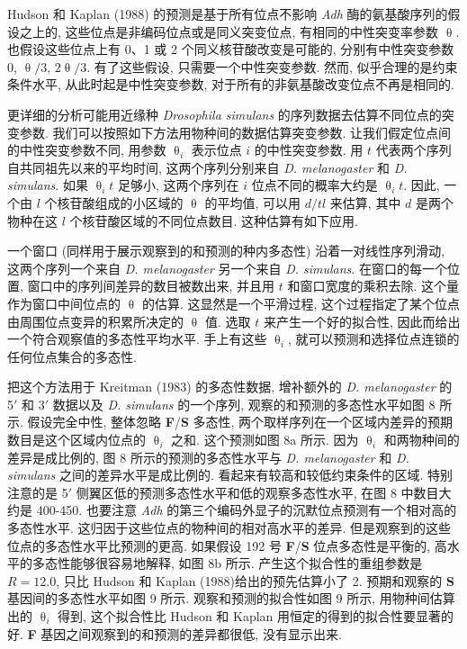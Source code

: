 \documentclass[
    12pt,%
    ]{article}
\begin{document}
Hudson 和 Kaplan (1988) 的预测是基于所有位点不影响 \textit{Adh} 酶的氨基酸序列的假设之上的,
这些位点是非编码位点或是同义突变位点, 有相同的中性突变率参数 $\uptheta$. 也假设这些位点上有 0、1 或 2
个同义核苷酸改变是可能的, 分别有中性突变参数 0, $\uptheta /3$, $2 \uptheta /3$. 有了这些假设, 只需要一个中性突变参数. 然而,
似乎合理的是约束条件水平, 从此时起是中性突变参数, 对于所有的非氨基酸改变位点不再是相同的.

更详细的分析可能用近缘种 \textit{Drosophila simulans} 的序列数据去估算不同位点的突变参数.
我们可以按照如下方法用物种间的数据估算突变参数. 让我们假定位点间的中性突变参数不同, 用参数 $\uptheta_{i}$ 表示位点 $i$
的中性突变参数. 用 $t$ 代表两个序列自共同祖先以来的平均时间, 这两个序列分别来自 \textit{D. melanogaster} 和
\textit{D. simulans}. 如果 $\uptheta_{i}t$ 足够小, 这两个序列在 $i$ 位点不同的概率大约是 $\uptheta_{i}t$. 因此,
一个由 $l$ 个核苷酸组成的小区域的 $\uptheta$ 的平均值, 可以用 $d/tl$ 来估算, 其中 $d$ 是两个物种在这 $l$
个核苷酸区域的不同位点数目. 这种估算有如下应用.

一个窗口 (同样用于展示观察到的和预测的种内多态性) 沿着一对线性序列滑动, 这两个序列一个来自 \textit{D.
    melanogaster} 另一个来自 \textit{D. simulans}. 在窗口的每一个位置, 窗口中的序列间差异的数目被数出来, 并且用 $t$
和窗口宽度的乘积去除. 这个量作为窗口中间位点的 $\uptheta$ 的估算. 这显然是一个平滑过程,
这个过程指定了某个位点由周围位点变异的积累所决定的 $\uptheta$ 值. 选取 $t$ 来产生一个好的拟合性,
因此而给出一个符合观察值的多态性平均水平. 手上有这些 $\uptheta_{i}$, 就可以预测和选择位点连锁的任何位点集合的多态性.

把这个方法用于 Kreitman (1983) 的多态性数据, 增补额外的 \textit{D. melanogaster} 的 5${\prime}$ 和
3${\prime}$ 数据以及 \textit{D. simulans} 的一个序列, 观察的和预测的多态性水平如图 8 所示. 假设完全中性,
整体忽略 \textbf{F}/\textbf{S} 多态性, 两个取样序列在一个区域内差异的预期数目是这个区域内位点的 $\uptheta _{i}$ 之和.
这个预测如图 8a 所示. 因为 $\uptheta _{i}$ 和两物种间的差异是成比例的, 图 8 所示的预测的多态性水平与 \textit{D.
    melanogaster} 和 \textit{D. simulans} 之间的差异水平是成比例的. 看起来有较高和较低约束条件的区域. 特别注意的是
5${\prime}$ 侧翼区低的预测多态性水平和低的观察多态性水平, 在图 8 中数目大约是 400-450.
也要注意 \textit{Adh} 的第三个编码外显子的沉默位点预测有一个相对高的多态性水平. 这归因于这些位点的物种间的相对高水平的差异.
但是观察到的这些位点的多态性水平比预测的更高. 如果假设 192 号 \textbf{F}/\textbf{S} 位点多态性是平衡的,
高水平的多态性能够很容易地解释, 如图 8b 所示. 产生这个拟合性的重组参数是 $R=12.0$, 只比 Hudson 和
Kaplan (1988)给出的预先估算小了 2. 预期和观察的 \textbf{S} 基因间的多态性水平如图 9 所示. 观察和预测的拟合性如图 9
所示, 用物种间估算出的 $\uptheta _{i}$ 得到, 这个拟合性比 Hudson 和 Kaplan 用恒定的得到的拟合性要显著的好.
\textbf{F} 基因之间观察到的和预测的差异都很低, 没有显示出来.
\end{document}
